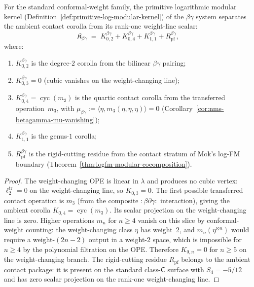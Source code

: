 \begin{proposition}
\label{prop:betagamma-primitive-kernel}
\ClaimStatusConditional
For the standard conformal-weight family, the primitive logarithmic
modular kernel
\textup{(}Definition~\textup{\ref{def:primitive-log-modular-kernel})}
of the $\beta\gamma$ system separates the ambient contact corolla from
its rank-one weight-line scalar:
\begin{equation}\label{eq:betagamma-primitive-kernel}
\mathfrak{K}_{\beta\gamma}
\;=\;
K_{0,2}^{\beta\gamma} + K_{0,4}^{\beta\gamma}
+ K_{1,1}^{\beta\gamma} + R_{\mathrm{pf}}^{\beta\gamma},
\end{equation}
where:
\begin{enumerate}[label=\textup{(\roman*)}]
\item $K_{0,2}^{\beta\gamma}$
 is the degree-$2$ corolla from the bilinear $\beta\gamma$ pairing;
\item $K_{0,3}^{\beta\gamma} = 0$
 \textup{(}cubic vanishes on the weight-changing line\textup{)};
\item $K_{0,4}^{\beta\gamma}
 = \operatorname{cyc}(m_3)$
 is the quartic contact corolla from the transferred operation~$m_3$,
 with $\mu_{\beta\gamma}
 := \langle\eta, m_3(\eta,\eta,\eta)\rangle = 0$
 \textup{(}Corollary~\textup{\ref{cor:nms-betagamma-mu-vanishing})};
\item $K_{1,1}^{\beta\gamma}$ is the genus-$1$ corolla;
\item $R_{\mathrm{pf}}^{\beta\gamma}$ is the rigid-cutting residue
 from the contact stratum of Mok's log-FM boundary
 \textup{(}Theorem~\textup{\ref{thm:logfm-modular-cocomposition})}.
\end{enumerate}
\end{proposition}

\begin{proof}
The weight-changing OPE is linear in $\lambda$ and produces
no cubic vertex: $\ell_2^{\mathrm{tr}} = 0$ on the weight-changing
line, so $K_{0,3} = 0$. The first possible transferred contact
operation is $m_3$ (from the composite
$:$$\beta\partial\gamma$$:$ interaction), giving the ambient corolla
$K_{0,4} = \operatorname{cyc}(m_3)$. Its scalar projection on the
weight-changing line is zero. Higher operations
$m_n$ for $n \geq 4$ vanish on this slice by conformal-weight
counting: the weight-changing class $\eta$ has weight~$2$, and
$m_n(\eta^{\otimes n})$ would require a weight-$(2n-2)$ output
in a weight-$2$ space, which is impossible for $n \geq 4$
by the polynomial filtration on the OPE. Therefore $K_{0,n} = 0$
for $n \geq 5$ on the weight-changing branch. The rigid-cutting
residue $R_{\mathrm{pf}}$ belongs to the ambient contact package:
it is present on the standard class-$\mathsf C$ surface with
$S_4=-5/12$ and has zero scalar projection on the rank-one
weight-changing line.
\end{proof}


